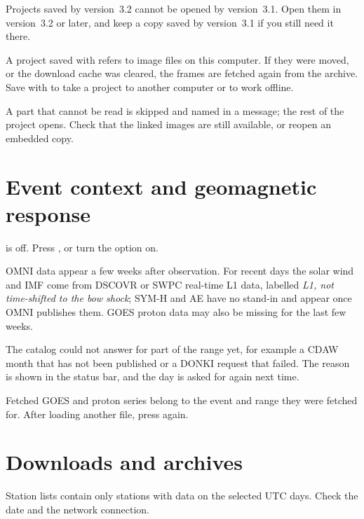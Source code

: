 Projects saved by version~3.2 cannot be opened by version~3.1. Open them in version~3.2 or
later, and keep a copy saved by version~3.1 if you still need it there.

A project saved with  refers to image files on this computer. If they were moved,
or the download cache was cleared, the frames are fetched again from the archive. Save with
 to take a project to another computer or to work offline.

A part that cannot be read is skipped and named in a message; the rest of the project opens.
Check that the linked images are still available, or reopen an embedded copy.

\section{Event context and geomagnetic response}

 is off. Press , or turn the
option on.

OMNI data appear a few weeks after observation. For recent days the solar wind and IMF come from
DSCOVR or SWPC real-time L1 data, labelled \emph{L1, not time-shifted to the bow shock}; SYM-H
and AE have no stand-in and appear once OMNI publishes them. GOES proton data may also be
missing for the last few weeks.

The catalog could not answer for part of the range yet, for example a CDAW month that has not
been published or a DONKI request that failed. The reason is shown in the status bar, and the
day is asked for again next time.

Fetched GOES and proton series belong to the event and range they were fetched for. After loading
another file, press  again.

\section{Downloads and archives}

Station lists contain only stations with data on the selected UTC days. Check the date and the
network connection.

